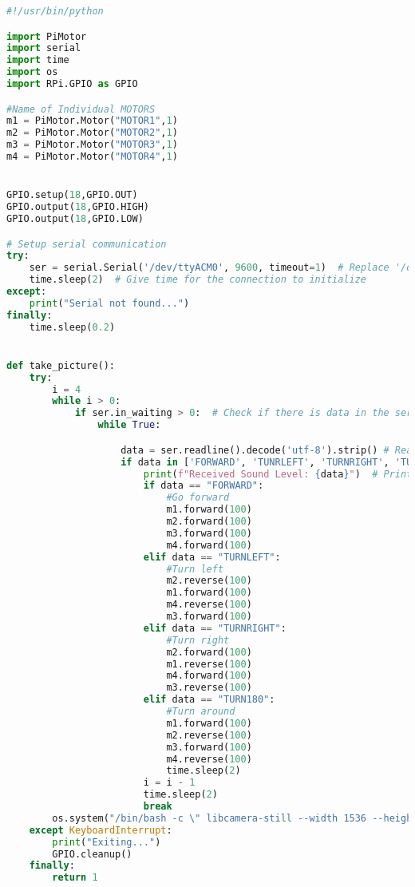 \documentclass[12pt,a4paper]{article}
\begin{document}
\begin{lstlisting}[language=Python, caption=Rasperry Pi Code]
#!/usr/bin/python

import PiMotor
import serial
import time
import os
import RPi.GPIO as GPIO

#Name of Individual MOTORS
m1 = PiMotor.Motor("MOTOR1",1)
m2 = PiMotor.Motor("MOTOR2",1)
m3 = PiMotor.Motor("MOTOR3",1)
m4 = PiMotor.Motor("MOTOR4",1)


GPIO.setup(18,GPIO.OUT)
GPIO.output(18,GPIO.HIGH)
GPIO.output(18,GPIO.LOW)

# Setup serial communication
try:
    ser = serial.Serial('/dev/ttyACM0', 9600, timeout=1)  # Replace '/dev/ttyUSB0' with the correct port if necessary
    time.sleep(2)  # Give time for the connection to initialize
except:
    print("Serial not found...")
finally:
    time.sleep(0.2)


def take_picture():
    try:
        i = 4
        while i > 0:
            if ser.in_waiting > 0:  # Check if there is data in the serial buffer
                while True:

                    data = ser.readline().decode('utf-8').strip() # Read and decode the data
                    if data in ['FORWARD', 'TUNRLEFT', 'TURNRIGHT', 'TURN180']:  #Make sure data is a movement command
                        print(f"Received Sound Level: {data}")  # Print the received data
                        if data == "FORWARD":
                            #Go forward
                            m1.forward(100)
                            m2.forward(100)
                            m3.forward(100)
                            m4.forward(100)
                        elif data == "TURNLEFT":
                            #Turn left
                            m2.reverse(100)
                            m1.forward(100)
                            m4.reverse(100)
                            m3.forward(100)
                        elif data == "TURNRIGHT":
                            #Turn right
                            m2.forward(100)
                            m1.reverse(100)
                            m4.forward(100)
                            m3.reverse(100)
                        elif data == "TURN180":
                            #Turn around
                            m1.forward(100)
                            m2.reverse(100)
                            m3.forward(100)
                            m4.reverse(100)
                            time.sleep(2)
                        i = i - 1
                        time.sleep(2)
                        break
        os.system("/bin/bash -c \" libcamera-still --width 1536 --height 1024 --vflip -o Picture.jpg \"")
    except KeyboardInterrupt:
        print("Exiting...")
        GPIO.cleanup()
    finally:
        return 1


\end{lstlisting}
\end{document}
